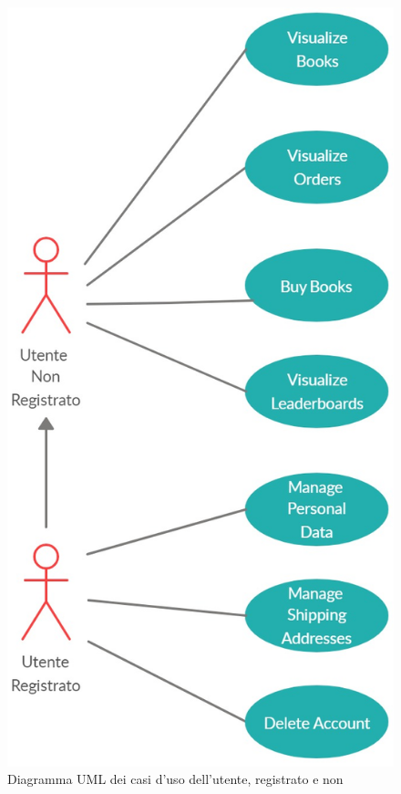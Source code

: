 \documentclass[a4paper,12pt,titlepage]{article}
\begin{document}
{{\begin{figure}[H]
		\centering
		\includegraphics[scale=0.42]{useCaseUser}
		\caption{Diagramma UML dei casi d'uso dell'utente, registrato e non }
\end{figure}

}}
\end{document}
